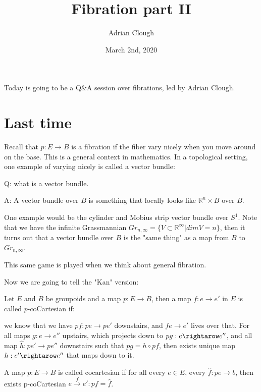 \documentclass[../main.tex]{subfiles}
\title{Fibration part II}
\author{Adrian Clough}
\date{March 2nd, 2020}
\begin{document}
\maketitle

\noident Today is going to be a Q&A session over fibrations, led by Adrian Clough. 
\tableofcontents

\section{Last time}

Recall that $p: E \rightarrow B$ is a fibration if the fiber vary nicely when you move around on the base. This is a general context in mathematics. In a topological setting, one example of varying nicely is called a vector bundle:

Q: what is a vector bundle.

A: A vector bundle over $B$ is something that locally looks like $\mathbb{R}^n \times B$ over $B$. 

One example would be the cylinder and Mobius strip vector bundle over $S^1$. Note that we have the infinite Grassmannian $Gr_{n,\infty} = \{V \subset \mathbb{R}^\infty|dim V = n\}$, then it turns out that a vector bundle over $B$ is the "same thing" as a map from $B$ to $Gr_{n,\infty}$. 

This same game is played when we think about general fibration. 

Now we are going to tell the "Kan" version:

\begin{definition}
Let $E$ and $B$ be groupoids and a map $p: E \rightarrow B$, then a map $f: e \rightarrow e'$ in $E$ is called $p$-coCartesian if: 

we know that we have $pf: pe \rightarrow pe'$ downstairs, and $fe \rightarrow e'$ lives over that. For all maps $g: e \rightarrow e''$ upstairs, which projects down to $pg: e \rightarow e''$, and all map $\hat{h}: pe' \rightarrow pe''$ downstairs such that $pg = h \circ pf$, then exists unique map $h: e' \rightarow e''$ that maps down to it. 

A map $p: E \rightarrow B$ is called cocartesian if for all every $e \in E$, every $\hat{f} : pe \rightarrow b$, then exists p-coCartesian $e \xrightarrow{f} e' : pf = \hat{f}$.
\end{definition}
\end{document}
